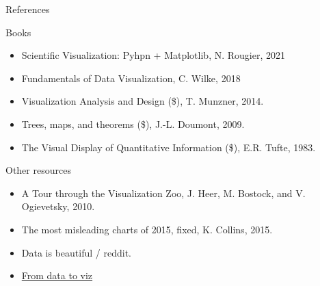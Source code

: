 \documentclass[10pt,aspectratio=169]{beamer}
\begin{document}
  
\begin{frame}{References}
  \begin{block}{Books}
    \vspace{0pt}
    \begin{itemize}
    \item Scientific Visualization: Pyhpn + Matplotlib, N. Rougier, 2021
    \item Fundamentals of Data Visualization, C. Wilke, 2018
    \item Visualization Analysis and Design (\$), T. Munzner, 2014.
    \item Trees, maps, and theorems (\$), J.-L. Doumont, 2009.
    \item The Visual Display of Quantitative Information (\$), E.R. Tufte, 1983.
    \end{itemize}
  \end{block}

  \begin{block}{Other resources}
    \vspace{0pt}
    \begin{itemize}
    \item A Tour through the Visualization Zoo, J. Heer, M. Bostock, and V. Ogievetsky, 2010.
    \item The most misleading charts of 2015, fixed, K. Collins, 2015.
    \item Data is beautiful / reddit.
    \item \href{https://www.data-to-viz.com}{From data to viz} 
    \end{itemize}
  \end{block}
  
  
\end{frame}





\end{document}
